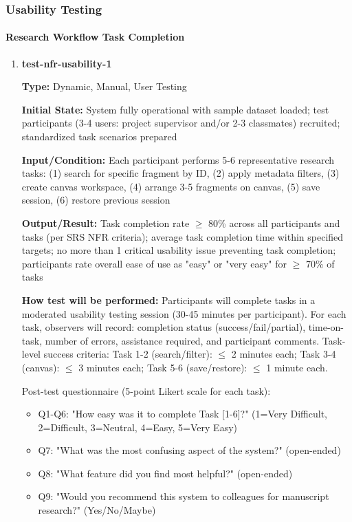\documentclass[12pt, titlepage]{article}
\begin{document}
\subsubsection{Usability Testing}

\paragraph{Research Workflow Task Completion}

\begin{enumerate}

\item \textbf{test-nfr-usability-1}

\textbf{Type:} Dynamic, Manual, User Testing

\textbf{Initial State:} System fully operational with sample dataset loaded; test participants (3-4 users: project supervisor and/or 2-3 classmates) recruited; standardized task scenarios prepared

\textbf{Input/Condition:} Each participant performs 5-6 representative research tasks: (1) search for specific fragment by ID, (2) apply metadata filters, (3) create canvas workspace, (4) arrange 3-5 fragments on canvas, (5) save session, (6) restore previous session

\textbf{Output/Result:} Task completion rate $\geq$ 80\% across all participants and tasks (per SRS NFR criteria); average task completion time within specified targets; no more than 1 critical usability issue preventing task completion; participants rate overall ease of use as "easy" or "very easy" for $\geq$ 70\% of tasks

\textbf{How test will be performed:} Participants will complete tasks in a moderated usability testing session (30-45 minutes per participant). For each task, observers will record: completion status (success/fail/partial), time-on-task, number of errors, assistance required, and participant comments. Task-level success criteria: Task 1-2 (search/filter): $\leq$ 2 minutes each; Task 3-4 (canvas): $\leq$ 3 minutes each; Task 5-6 (save/restore): $\leq$ 1 minute each.

Post-test questionnaire (5-point Likert scale for each task):
\begin{itemize}
\item Q1-Q6: "How easy was it to complete Task [1-6]?" (1=Very Difficult, 2=Difficult, 3=Neutral, 4=Easy, 5=Very Easy)
\item Q7: "What was the most confusing aspect of the system?" (open-ended)
\item Q8: "What feature did you find most helpful?" (open-ended)
\item Q9: "Would you recommend this system to colleagues for manuscript research?" (Yes/No/Maybe)
\end{itemize}


\end{enumerate}
\end{document}
